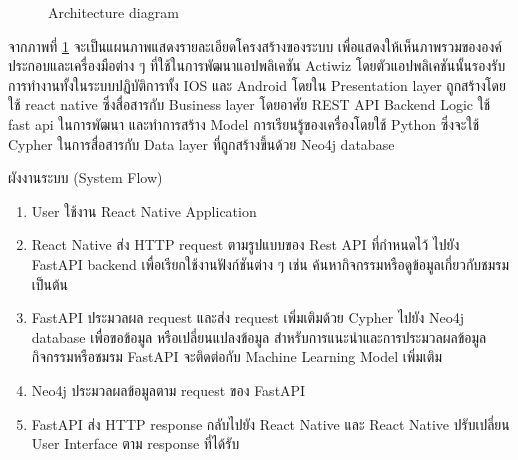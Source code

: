 \documentclass[14pt,oneside,openright,a4paper]{cpe-thai-project}
\begin{document}
  \begin{figure}[!h]\centering
    \setlength{\fboxrule}{0.5mm} %
    \setlength{\fboxsep}{0.5cm}
    \caption{Architecture diagram}\label{fig:ArchDia}
    \end{figure}

  จากภาพที่ \ref{fig:ArchDia} จะเป็นแผนภาพแสดงรายละเอียดโครงสร้างของระบบ เพื่อแสดงให้เห็นภาพรวมขององค์ประกอบและเครื่องมือต่าง ๆ ที่ใช้ในการพัฒนาแอปพลิเคชัน Actiwiz โดยตัวแอปพลิเคชันนั้นรองรับการทำงานทั้งในระบบปฏิบัติการทั้ง IOS และ Android โดยใน Presentation layer ถูกสร้างโดยใช้ react native ซึ่งสื่อสารกับ Business layer โดยอาศัย REST API Backend Logic ใช้ fast api ในการพัฒนา และทำการสร้าง Model การเรียนรู้ของเครื่องโดยใช้ Python ซึ่งจะใช้ Cypher ในการสื่อสารกับ Data layer ที่ถูกสร้างขึ้นด้วย Neo4j database
\newpage

ผังงานระบบ (System Flow)
\begin{enumerate}
  \item User ใช้งาน React Native Application
  \item React Native ส่ง HTTP request ตามรูปแบบของ Rest API ที่กำหนดไว้ ไปยัง FastAPI backend เพื่อเรียกใช้งานฟังก์ชันต่าง ๆ เช่น ค้นหากิจกรรมหรือดูข้อมูลเกี่ยวกับชมรม เป็นต้น
  \item FastAPI ประมวลผล request และส่ง request เพิ่มเติมด้วย Cypher ไปยัง Neo4j database เพื่อขอข้อมูล หรือเปลี่ยนแปลงข้อมูล
    สำหรับการแนะนำและการประมวลผลข้อมูลกิจกรรมหรือชมรม FastAPI จะติดต่อกับ Machine Learning Model เพิ่มเติม
  \item Neo4j ประมวลผลข้อมูลตาม request ของ FastAPI
  \item FastAPI ส่ง HTTP response กลับไปยัง React Native และ React Native ปรับเปลี่ยน User Interface ตาม response ที่ได้รับ
\end{enumerate}
\end{document}
